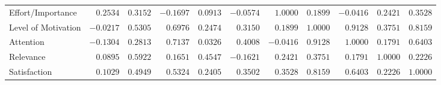 \documentclass[6pt]{article}
\begin{document}
\begin{landscape}
{\begin{longtable}{lrrrrrrrrrr}
Effort/Importance&$ 0.2534$&$ 0.3152$&$-0.1697$&$ 0.0913$&$-0.0574$&$ 1.0000$&$ 0.1899$&$-0.0416$&$ 0.2421$&$0.3528$\tabularnewline
Level of Motivation&$-0.0217$&$ 0.5305$&$ 0.6976$&$ 0.2474$&$ 0.3150$&$ 0.1899$&$ 1.0000$&$ 0.9128$&$ 0.3751$&$0.8159$\tabularnewline
Attention&$-0.1304$&$ 0.2813$&$ 0.7137$&$ 0.0326$&$ 0.4008$&$-0.0416$&$ 0.9128$&$ 1.0000$&$ 0.1791$&$0.6403$\tabularnewline
Relevance&$ 0.0895$&$ 0.5922$&$ 0.1651$&$ 0.4547$&$-0.1621$&$ 0.2421$&$ 0.3751$&$ 0.1791$&$ 1.0000$&$0.2226$\tabularnewline
Satisfaction&$ 0.1029$&$ 0.4949$&$ 0.5324$&$ 0.2405$&$ 0.3502$&$ 0.3528$&$ 0.8159$&$ 0.6403$&$ 0.2226$&$1.0000$\tabularnewline
\hline
\end{longtable}}\end{landscape}

\end{document}
